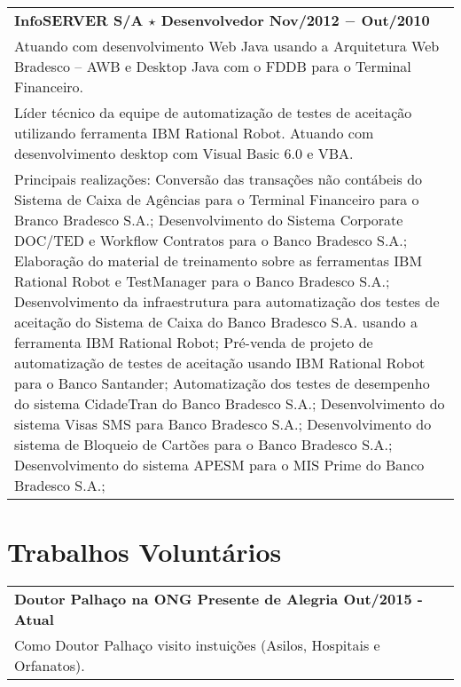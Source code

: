 \documentclass[a4paper, oneside, final]{scrartcl}
\newcommand{\vspc}{\vspace{0.15cm}} %
\begin{document}
\begin{center}
\begin{tabularx}{1\linewidth}{X}
{\bf InfoSERVER S/A $\star$ Desenvolvedor \hfill Nov/2012 $-$ Out/2010} \\
Atuando com desenvolvimento Web Java usando a Arquitetura Web Bradesco – AWB e Desktop Java com o
FDDB para o Terminal Financeiro. \vspc\\
Líder técnico da equipe de automatização de testes de aceitação utilizando ferramenta IBM Rational
Robot. Atuando com desenvolvimento desktop com Visual Basic 6.0 e VBA. \vspc\\
Principais realizações: Conversão das transações não contábeis do Sistema de Caixa de Agências para o
Terminal Financeiro para o Branco Bradesco S.A.; Desenvolvimento do Sistema Corporate DOC/TED e
Workflow Contratos para o Banco Bradesco S.A.; Elaboração do material de treinamento sobre as ferramentas
IBM Rational Robot e TestManager para o Banco Bradesco S.A.; Desenvolvimento da infraestrutura para
automatização dos testes de aceitação do Sistema de Caixa do Banco Bradesco S.A. usando a ferramenta IBM
Rational Robot; Pré-venda de projeto de automatização de testes de aceitação usando IBM Rational Robot para o Banco Santander; Automatização dos testes de desempenho do sistema CidadeTran do Banco Bradesco 
S.A.; Desenvolvimento do sistema Visas SMS para Banco Bradesco S.A.; Desenvolvimento do sistema de
Bloqueio de Cartões para o Banco Bradesco S.A.; Desenvolvimento do sistema APESM para o MIS Prime do
Banco Bradesco S.A.; 

\end{tabularx}

\section{Trabalhos Voluntários}
\begin{tabularx}{1\linewidth}{X}
{\bf Doutor Palhaço na ONG Presente de Alegria \hfill Out/2015 - Atual} \\
Como Doutor Palhaço visito instuições (Asilos, Hospitais e Orfanatos). \vspc\\
\end{tabularx}

\end{center}
\end{document}
